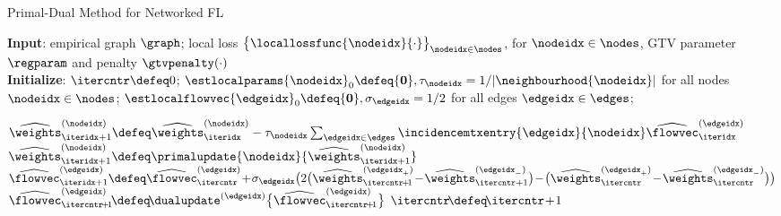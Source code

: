 \documentclass[lettersize,journal]{IEEEtran}
\begin{document}
\begin{algorithm}[htbp]
	\caption{Primal-Dual Method for Networked FL}
	\label{alg1}
	{\bf Input}: empirical graph $\graph$; local loss $\big\{ \locallossfunc{\nodeidx}{\cdot}\big\}_{\nodeidx \in \nodes}$, for $\nodeidx \in \nodes$,  
	GTV parameter $\regparam$ and penalty $\gtvpenalty(\cdot)$\\
	{\bf Initialize}: $\itercntr \defeq 0$; $\estlocalparams{\nodeidx}_0 \defeq {\bf 0}, \tau_{\nodeidx}=1/|\neighbourhood{\nodeidx}|$ for all nodes $\nodeidx \in \nodes$; $\estlocalflowvec{\edgeidx}_0 \defeq  {\bf 0}, \sigma_{\edgeidx}=1/2$ for all edges $\edgeidx \in \edges$;   
	\begin{algorithmic}[1]
		 \label{equ_stopping_criterion}
		\State $\widehat{\weights}_{\iteridx+1}^{(\nodeidx)} \defeq \widehat{\weights}^{(\nodeidx)}_\iteridx -  \tau_{\nodeidx} \sum_{\edgeidx \in \edges} \incidencemtxentry{\edgeidx}{\nodeidx}\widehat{\flowvec}^{(\edgeidx)}_\iteridx $ \label{equ_non_labled_pu}
		\State $\widehat{\weights}_{\iteridx+1}^{(\nodeidx)} \defeq \primalupdate{\nodeidx} {\widehat{\weights}_{\iteridx+1}^{(\nodeidx)}}$ \label{primal_udpate}
		\EndFor
	    \State  $\widehat{\flowvec}^{(\edgeidx)}_{\iteridx+1} \defeq \widehat{\flowvec}^{(\edgeidx)}_\itercntr\!+\!\sigma_{\edgeidx} \big(2 \big(\widehat{\weights}^{(\edgeidx_{+})}_{\itercntr\!+\!1}\!-\!\widehat{\weights}^{(\edgeidx_{-})}_{\itercntr+1}\big)\!-\!  \big(\widehat{\weights}^{(\edgeidx_{+})}_{\itercntr}\!-\!\widehat{\weights}^{(\edgeidx_{-})}_{\itercntr} \big)\big)$ \label{alg1_compute_diff_edge}
		\State $\widehat{\flowvec}^{(\edgeidx)}_{\itercntr\!+\!1} \!\defeq\!\dualupdate^{(\edgeidx)} \big\{ \widehat{\flowvec}^{(\edgeidx)}_{\itercntr\!+\!1} \big\}$  \label{eq_dual_update}
		\EndFor
		\State $\itercntr\!\defeq\!\itercntr\!+\!1$
		\EndWhile
	\end{algorithmic}
\end{algorithm}
\end{document}
